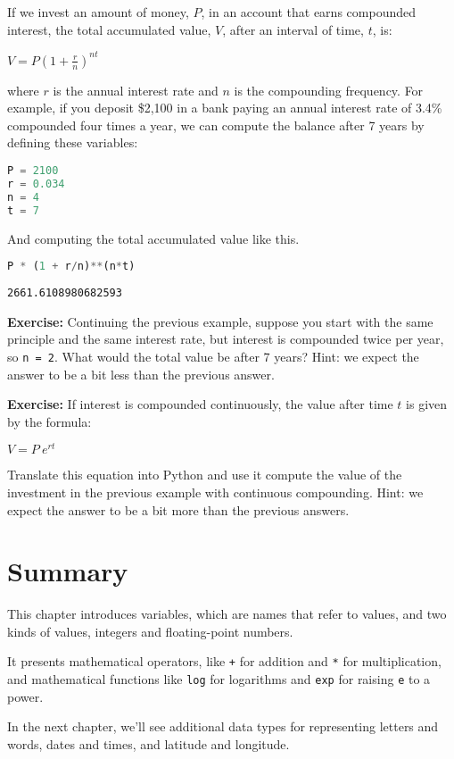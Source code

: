 If we invest an amount of money, \(P\), in an account that earns
compounded interest, the total accumulated value, \(V\), after an
interval of time, \(t\), is:

\(V=P\left(1+{\frac {r}{n}}\right)^{nt}\)

where \(r\) is the annual interest rate and \(n\) is the compounding
frequency. For example, if you deposit \$2,100 in a bank paying an
annual interest rate of 3.4\% compounded four times a year, we can
compute the balance after 7 years by defining these variables:

\begin{lstlisting}[language=Python,style=source]
P = 2100
r = 0.034
n = 4
t = 7
\end{lstlisting}

And computing the total accumulated value like this.

\begin{lstlisting}[language=Python,style=source]
P * (1 + r/n)**(n*t)
\end{lstlisting}

\begin{lstlisting}[style=output]
2661.6108980682593
\end{lstlisting}

\textbf{Exercise:} Continuing the previous example, suppose you start
with the same principle and the same interest rate, but interest is
compounded twice per year, so \passthrough{\lstinline!n = 2!}. What
would the total value be after 7 years? Hint: we expect the answer to be
a bit less than the previous answer.

\textbf{Exercise:} If interest is compounded continuously, the value
after time \(t\) is given by the formula:

\(V=P~e^{rt}\)

Translate this equation into Python and use it compute the value of the
investment in the previous example with continuous compounding. Hint: we
expect the answer to be a bit more than the previous answers.

\hypertarget{summary}{%
\section{Summary}\label{summary}}

This chapter introduces variables, which are names that refer to values,
and two kinds of values, integers and floating-point numbers.

It presents mathematical operators, like \passthrough{\lstinline!+!} for
addition and \passthrough{\lstinline!*!} for multiplication, and
mathematical functions like \passthrough{\lstinline!log!} for logarithms
and \passthrough{\lstinline!exp!} for raising
\passthrough{\lstinline!e!} to a power.

In the next chapter, we'll see additional data types for representing
letters and words, dates and times, and latitude and longitude.

